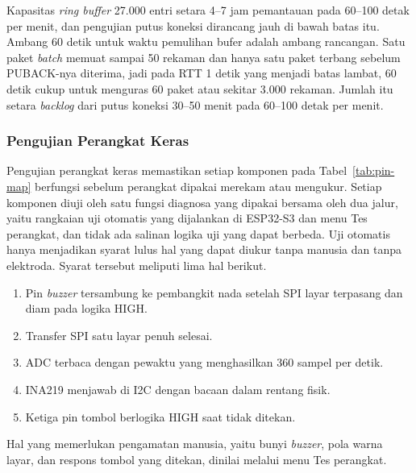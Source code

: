 Kapasitas \textit{ring buffer} 27.000 entri setara 4--7 jam pemantauan pada 60--100 detak per menit, dan pengujian putus koneksi dirancang jauh di bawah batas itu. Ambang 60 detik untuk waktu pemulihan bufer adalah ambang rancangan. Satu paket \textit{batch} memuat sampai 50 rekaman dan hanya satu paket terbang sebelum PUBACK-nya diterima, jadi pada RTT 1 detik yang menjadi batas lambat, 60 detik cukup untuk menguras 60 paket atau sekitar 3.000 rekaman. Jumlah itu setara \textit{backlog} dari putus koneksi 30--50 menit pada 60--100 detak per menit.

\subsubsection{Pengujian Perangkat Keras}

Pengujian perangkat keras memastikan setiap komponen pada Tabel~\ref{tab:pin-map} berfungsi sebelum perangkat dipakai merekam atau mengukur. Setiap komponen diuji oleh satu fungsi diagnosa yang dipakai bersama oleh dua jalur, yaitu rangkaian uji otomatis yang dijalankan di ESP32-S3 dan menu Tes perangkat, dan tidak ada salinan logika uji yang dapat berbeda. Uji otomatis hanya menjadikan syarat lulus hal yang dapat diukur tanpa manusia dan tanpa elektroda. Syarat tersebut meliputi lima hal berikut.
\begin{enumerate}[label=\alph*.]
  \item Pin \textit{buzzer} tersambung ke pembangkit nada setelah SPI layar terpasang dan diam pada logika HIGH.
  \item Transfer SPI satu layar penuh selesai.
  \item ADC terbaca dengan pewaktu yang menghasilkan 360 sampel per detik.
  \item INA219 menjawab di I2C dengan bacaan dalam rentang fisik.
  \item Ketiga pin tombol berlogika HIGH saat tidak ditekan.
\end{enumerate}
Hal yang memerlukan pengamatan manusia, yaitu bunyi \textit{buzzer}, pola warna layar, dan respons tombol yang ditekan, dinilai melalui menu Tes perangkat.


